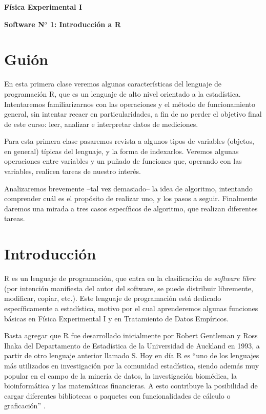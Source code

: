 \documentclass[11pt,a4paper]{article}
\begin{document}
\vspace*{0.250cm}

\begin{center}
{\bf \large {Física Experimental I}} \linebreak



\bf{ Software N$^o$ 1: Introducción a R}\linebreak
 
\end{center}

\section*{Guión} \nonumber

En esta primera clase veremos algunas características del lenguaje de programación R, que es un lenguaje de alto nivel orientado a la estadística. Intentaremos familiarizarnos con las operaciones y el método de funcionamiento general, sin intentar recaer en particularidades, a fin de no perder el objetivo final de este curso: leer, analizar e interpretar datos de mediciones.

Para esta primera clase pasaremos revista a algunos tipos de variables (objetos, en general) típicas del lenguaje, y la forma de indexarlos. Veremos algunas operaciones entre variables y un puñado de funciones que, operando con las variables, realicen tareas de nuestro interés.

Analizaremos brevemente --tal vez demasiado-- la idea de algoritmo, intentando comprender cuál es el propósito de realizar uno, y los pasos a seguir. Finalmente daremos una mirada a tres casos específicos de algoritmo, que realizan diferentes tareas.

\bigskip

\section{Introducción}

R es un lenguaje de programación, que entra en la clasificación de \textit{software libre} (por intención manifiesta del autor del software, se puede distribuir libremente, modificar, copiar, etc.). Este lenguaje de programación está dedicado específicamente a estadística, motivo por el cual aprenderemos algunas funciones básicas en Física Experimental I y en Tratamiento de Datos Empíricos.

Basta agregar que R fue desarrollado inicialmente por Robert Gentleman y Ross Ihaka del Departamento de Estadística de la Universidad de Auckland en 1993, a partir de otro lenguaje anterior llamado S. Hoy en día R es ``uno de los lenguajes más utilizados en investigación por la comunidad estadística, siendo además muy popular en el campo de la minería de datos, la investigación biomédica, la bioinformática y las matemáticas financieras. A esto contribuye la posibilidad de cargar diferentes bibliotecas o paquetes con funcionalidades de cálculo o graficación''  \textbf{\cite{wikiR}}.
\end{document}
